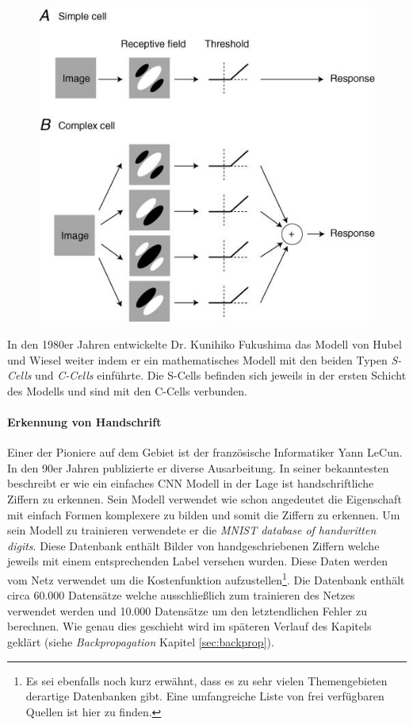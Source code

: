 \begin{figure}[!htb]
	\centering
	\includegraphics[width=.6\linewidth]{img/simpleVsComplex}
	\label{fig:simpleVsComplex}
\end{figure}

In den 1980er Jahren entwickelte Dr. Kunihiko Fukushima das Modell von Hubel und Wiesel weiter indem er ein mathematisches Modell mit den beiden Typen \emph{S-Cells} und \emph{C-Cells} einführte. Die S-Cells befinden sich jeweils in der ersten Schicht des Modells und sind mit den C-Cells verbunden. 

\paragraph{Erkennung von Handschrift}
Einer der Pioniere auf dem Gebiet ist der französische Informatiker Yann LeCun. In den 90er Jahren publizierte er diverse Ausarbeitung. In seiner bekanntesten beschreibt er wie ein einfaches CNN Modell in der Lage ist handschriftliche Ziffern zu erkennen. Sein Modell verwendet wie schon angedeutet die Eigenschaft mit einfach Formen komplexere zu bilden und somit die Ziffern zu erkennen. Um sein Modell zu trainieren verwendete er die \emph{MNIST database of handwritten digits}. Diese Datenbank enthält Bilder von handgeschriebenen Ziffern welche jeweils mit einem entsprechenden Label versehen wurden. Diese Daten werden vom Netz verwendet um die Kostenfunktion aufzustellen\footnote{Es sei ebenfalls noch kurz erwähnt, dass es zu sehr vielen Themengebieten derartige Datenbanken gibt. Eine umfangreiche Liste von frei verfügbaren Quellen ist hier \cite{openDataSets} zu finden.}. Die Datenbank enthält circa 60.000 Datensätze welche ausschließlich zum trainieren des Netzes verwendet werden und 10.000 Datensätze um den letztendlichen Fehler zu berechnen. Wie genau dies geschieht wird im späteren Verlauf des Kapitels geklärt (siehe \emph{Backpropagation} Kapitel \ref{sec:backprop}).

